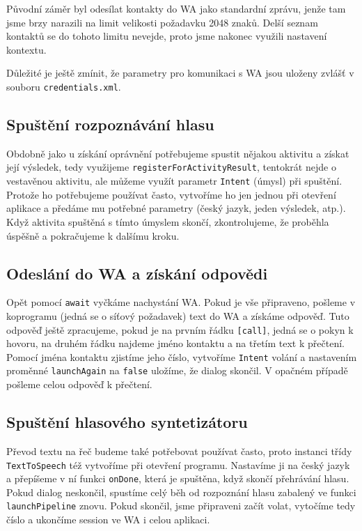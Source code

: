 Původní záměr byl odesílat kontakty do WA jako standardní zprávu, jenže
tam jsme brzy narazili na limit velikosti požadavku 2048 znaků. Delší
seznam kontaktů se do tohoto limitu nevejde, proto jsme nakonec využili
nastavení kontextu.

Důležité je ještě zmínit, že parametry pro komunikaci s WA jsou uloženy
zvlášť v souboru \texttt{credentials.xml}.

\subsection{Spuštění rozpoznávání hlasu}

Obdobně jako u získání
oprávnění potřebujeme spustit nějakou aktivitu a získat její výsledek, tedy
využijeme \texttt{registerForActivityResult}, tentokrát nejde o vestavěnou
aktivitu, ale můžeme využít parametr \texttt{Intent} (úmysl) při spuštění.
Protože ho potřebujeme používat často, vytvoříme ho jen jednou při otevření
aplikace a předáme mu potřebné parametry (český jazyk, jeden výsledek, atp.).
Když aktivita spuštěná s tímto úmyslem skončí, zkontrolujeme, že proběhla
úspěšně a pokračujeme k dalšímu kroku.

\subsection{Odeslání do WA a získání odpovědi}
Opět pomocí \texttt{await} vyčkáme nachystání WA. Pokud je vše připraveno,
pošleme v koprogramu (jedná se o síťový požadavek) text do WA a získáme odpověď.
Tuto odpověď ještě zpracujeme, pokud je na prvním řádku \texttt{[call]}, jedná
se o pokyn k hovoru, na druhém řádku najdeme jméno kontaktu a na třetím text k
přečtení. Pomocí jména kontaktu zjistíme jeho číslo, vytvoříme \texttt{Intent}
volání a nastavením proměnné \texttt{launchAgain} na \texttt{false} uložíme,
že dialog skončil. V opačném případě pošleme celou odpověď k přečtení.

\subsection{Spuštění hlasového syntetizátoru}

Převod textu na řeč budeme také potřebovat používat často, proto instanci
třídy \texttt{TextToSpeech} též vytvoříme při otevření programu. Nastavíme
ji na český jazyk a přepíšeme v ní funkci \texttt{onDone}, která je spuštěna,
když skončí přehrávání hlasu. Pokud dialog neskončil, spustíme celý běh
od rozpoznání hlasu zabalený ve funkci \texttt{launchPipeline} znovu. Pokud
skončil, jsme připraveni začít volat, vytočíme tedy číslo a ukončíme session ve
WA i celou aplikaci.

